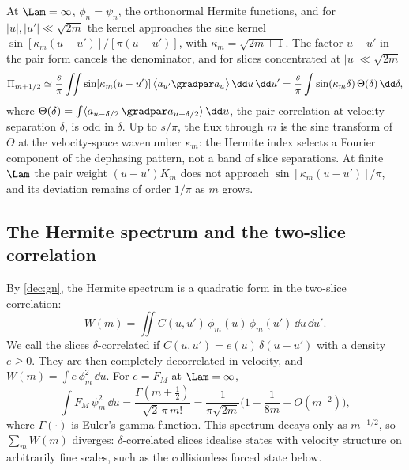 At $\Lam=\infty$, $\phi_n=\psi_n$, the orthonormal Hermite functions, and for $|u|,|u'|\ll\sqrt{2m}$ the kernel approaches the sine kernel $\sin[\kappa_m(u-u')]/[\pi(u-u')]$, with $\kappa_m=\sqrt{2m+1}$. The factor $u-u'$ in the pair form cancels the denominator, and for slices concentrated at $|u|\ll\sqrt{2m}$
\begin{equation*}
  \Pi_{m+1/2}\simeq\frac{s}{\pi}\iint\sin[\kappa_m(u-u')]\,\big\langle a_{u'}\gradpar a_u\big\rangle\,\dd u\,\dd u'
  =\frac{s}{\pi}\int\sin(\kappa_m\delta)\,\Theta(\delta)\,\dd\delta ,
\end{equation*}
where $\Theta(\delta)=\int\langle a_{\bar u-\delta/2}\,\gradpar a_{\bar u+\delta/2}\rangle\,\dd\bar u$, the pair correlation at velocity separation $\delta$, is odd in $\delta$. Up to $s/\pi$, the flux through $m$ is the sine transform of $\Theta$ at the velocity-space wavenumber $\kappa_m$: the Hermite index selects a Fourier component of the dephasing pattern, not a band of slice separations. At finite $\Lam$ the pair weight $(u-u')K_m$ does not approach $\sin[\kappa_m(u-u')]/\pi$, and its deviation remains of order $1/\pi$ as $m$ grows.

\subsection{The Hermite spectrum and the two-slice correlation}\label{dec:sec-dictionary}

By \eqref{dec:gn}, the Hermite spectrum is a quadratic form in the two-slice correlation:
\begin{equation}\label{eq:dictionary}
  W(m)=\iint C(u,u')\,\phi_m(u)\,\phi_m(u')\,\dd u\,\dd u' .
\end{equation}
We call the slices $\delta$-correlated if $C(u,u')=e(u)\,\delta(u-u')$ with a density $e\ge0$. They are then completely decorrelated in velocity, and $W(m)=\int e\,\phi_m^2\,\dd u$. For $e=F_M$ at $\Lam=\infty$,
\begin{equation}\label{eq:prefactor}
  \int F_M\,\psi_m^2\,\dd u=\frac{\Gamma(m+\frac12)}{\sqrt2\,\pi\,m!}=\frac{1}{\pi\sqrt{2m}}\Big(1-\frac{1}{8m}+O(m^{-2})\Big),
\end{equation}
where $\Gamma(\cdot)$ is Euler's gamma function. This spectrum decays only as $m^{-1/2}$, so $\sum_mW(m)$ diverges: $\delta$-correlated slices idealise states with velocity structure on arbitrarily fine scales, such as the collisionless forced state below.

